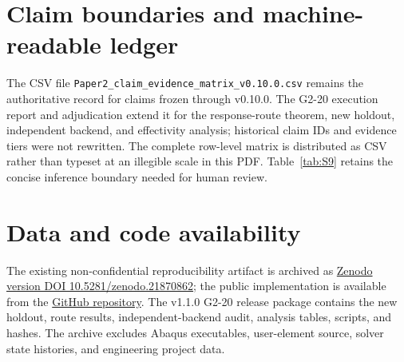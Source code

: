 \documentclass[11pt]{article}
\begin{document}
\section{Claim boundaries and machine-readable ledger}
The CSV file \texttt{Paper2\_claim\_evidence\_matrix\_v0.10.0.csv} remains
the authoritative record for claims frozen through v0.10.0. The G2-20
execution report and adjudication extend it for the response-route theorem,
new holdout, independent backend, and effectivity analysis; historical claim
IDs and evidence tiers were not rewritten.
The complete row-level matrix is distributed as CSV rather than typeset at an
illegible scale in this PDF. Table~\ref{tab:S9} retains the concise inference
boundary needed for human review.

\begin{table}[htbp]\centering\small
\caption{Interpretation boundary by claim domain}\label{tab:S9}

\end{table}

\section*{Data and code availability}
The existing non-confidential reproducibility artifact is archived as
\href{https://doi.org/10.5281/zenodo.21870862}{Zenodo version DOI
10.5281/zenodo.21870862}; the public implementation is available from the
\href{https://github.com/yqma7980/scale-explicit-matrix-perturbation-observability}{GitHub repository}.
The v1.1.0 G2-20 release package contains the new holdout, route results,
independent-backend audit, analysis tables, scripts, and hashes. The archive
excludes Abaqus executables, user-element source, solver state histories, and
engineering project data.
\end{document}
